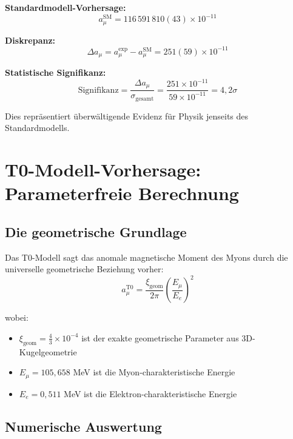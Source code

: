 \documentclass[12pt,a4paper]{report}
\newcommand{\xigeom}{\xi_{\text{geom}}}   %
\newcommand{\Ee}{E_e}                     %
\newcommand{\Emu}{E_\mu}                  %
\begin{document}
	\textbf{Standardmodell-Vorhersage:}
	\begin{equation}
		a_\mu^{\text{SM}} = 116\,591\,810(43) \times 10^{-11}
		\label{eq:sm_prediction}
	\end{equation}
	
	\textbf{Diskrepanz:}
	\begin{equation}
		\Delta a_\mu = a_\mu^{\text{exp}} - a_\mu^{\text{SM}} = 251(59) \times 10^{-11}
		\label{eq:discrepancy}
	\end{equation}
	
	\textbf{Statistische Signifikanz:}
	\begin{equation}
		\text{Signifikanz} = \frac{\Delta a_\mu}{\sigma_{\text{gesamt}}} = \frac{251 \times 10^{-11}}{59 \times 10^{-11}} = 4,2\sigma
		\label{eq:significance}
	\end{equation}
	
	Dies repräsentiert überwältigende Evidenz für Physik jenseits des Standardmodells.
	
	\section{T0-Modell-Vorhersage: Parameterfreie Berechnung}
	\label{sec:t0_prediction}
	
	\subsection{Die geometrische Grundlage}
	\label{subsec:geometric_foundation}
	
	Das T0-Modell sagt das anomale magnetische Moment des Myons durch die universelle geometrische Beziehung vorher:
	\begin{equation}
		a_\mu^{\text{T0}} = \frac{\xigeom}{2\pi} \left(\frac{\Emu}{\Ee}\right)^2
		\label{eq:t0_prediction}
	\end{equation}
	
	wobei:
	\begin{itemize}
		\item $\xigeom = \frac{4}{3} \times 10^{-4}$ ist der exakte geometrische Parameter aus 3D-Kugelgeometrie
		\item $\Emu = 105,658$ MeV ist die Myon-charakteristische Energie
		\item $\Ee = 0,511$ MeV ist die Elektron-charakteristische Energie
	\end{itemize}
	
	\subsection{Numerische Auswertung}
	\label{subsec:numerical_evaluation}
	
\end{document}
